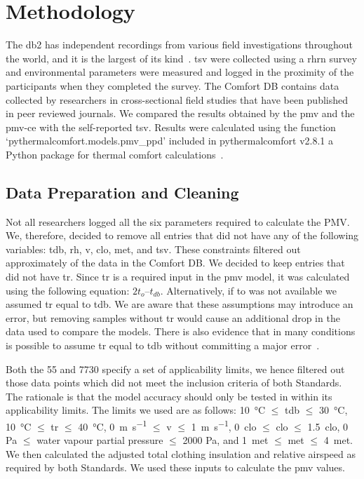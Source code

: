 

\section{Methodology}\label{sec:methodology}

The \gls{db2} has  independent recordings from various field investigations throughout the world, and it is the largest of its kind~\cite{FoldvaryLicina2018, db2dryad}.
\Ac{tsv} were collected using a \gls{rhrn} survey and environmental parameters were measured and logged in the proximity of the participants when they completed the survey.
The Comfort DB contains data collected by researchers in cross-sectional field studies that have been published in peer reviewed journals.
 We compared the results obtained by the \ac{pmv} and the \gls{pmv-ce} with the self-reported \ac{tsv}.
Results were calculated using the function `pythermalcomfort.models.pmv\_ppd' included in pythermalcomfort v2.8.1 a Python package for thermal comfort calculations~\cite{Tartarini2020a}.

\subsection{Data Preparation and Cleaning}\label{subsec:data-processing-and-cleaning}
Not all researchers logged all the six parameters required to calculate the PMV.\@
We, therefore, decided to remove all entries that did not have any of the following variables: \ac{tdb}, \ac{rh}, \ac{v}, \ac{clo}, \ac{met}, and \ac{tsv}.
These constraints filtered out approximately  of the data in the Comfort DB.\@
We decided to keep entries that did not have \ac{tr}.
Since \ac{tr} is a required input in the \ac{pmv} model, it was calculated using the following equation: $2 t_{o} – t_{db}$.
Alternatively, if \ac{to} was not available we assumed \ac{tr} equal to \ac{tdb}.
We are aware that these assumptions may introduce an error, but removing samples without \ac{tr} would cause an additional  drop in the data used to compare the models.
There is also evidence that in many conditions is possible to assume \ac{tr} equal to \ac{tdb} without committing a major error~\cite{Dawe2020}.

Both the \gls{55} and \gls{7730} specify a set of applicability limits, we hence filtered out those data points which did not meet the inclusion criteria of both Standards.
The rationale is that the model accuracy should only be tested in within its applicability limits.
The limits we used are as follows:
\qty{10}{\celsius} $\leq$ \ac{tdb} $\leq$ \qty{30}{\celsius},
\qty{10}{\celsius} $\leq$ \ac{tr} $\leq$ \qty{40}{\celsius},
\qty{0}{\m\per\s} $\leq$ \ac{v} $\leq$ \qty{1}{\m\per\s},
\qty{0}{clo} $\leq$ \ac{clo} $\leq$ \qty{1.5}{clo},
0 Pa $\leq$ water vapour partial pressure $\leq$ 2000 Pa,
and \qty{1}{met} $\leq$ \ac{met} $\leq$ \qty{4}{met}.
We then calculated the adjusted total clothing insulation and relative airspeed as required by both Standards.
We used these inputs to calculate the \ac{pmv} values.

